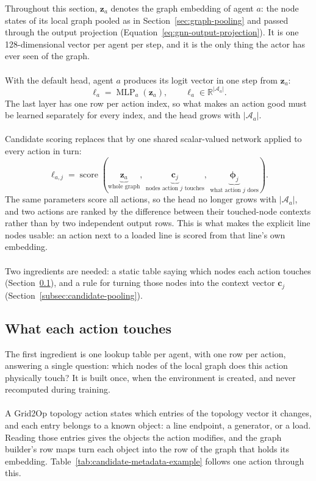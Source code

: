 Throughout this section, $\mathbf{z}_a$ denotes the graph embedding of agent
$a$: the node states of its local graph pooled as in
Section~\ref{sec:graph-pooling} and passed through the output projection
(Equation~\ref{eq:gnn-output-projection}). It is one 128-dimensional vector per
agent per step, and it is the only thing the actor has ever seen of the graph.
\\
\\
With the default head, agent $a$ produces its logit vector in one step from
$\mathbf{z}_a$:
\begin{equation}
  \boldsymbol{\ell}_a = \operatorname{MLP}_a(\mathbf{z}_a),
  \qquad \boldsymbol{\ell}_a\in\mathbb{R}^{|\mathcal{A}_a|}.
  \label{eq:action-index-head}
\end{equation}
The last layer has one row per action index, so what makes an action good must
be learned separately for every index, and the head grows with
$|\mathcal{A}_a|$.
\\
\\
Candidate scoring replaces that by one shared scalar-valued network applied to
every action in turn:
\begin{equation}
  \ell_{a,j} =
  \operatorname{score}
  \left(
    \underbrace{\mathbf{z}_a}_{\text{whole graph}},\
    \underbrace{\mathbf{c}_j}_{\text{nodes action }j\text{ touches}},\
    \underbrace{\boldsymbol{\phi}_j}_{\text{what action }j\text{ does}}
  \right).
  \label{eq:candidate-scoring-head}
\end{equation}
The same parameters score all actions, so the head no longer grows with
$|\mathcal{A}_a|$, and two actions are ranked by the difference between their
touched-node contexts rather than by two independent output rows. This is what
makes the explicit line nodes usable: an action next to a loaded line is scored
from that line's own embedding.
\\
\\
Two ingredients are needed: a static table saying which nodes each action
touches (Section~\ref{subsec:candidate-action-metadata}), and a rule for
turning those nodes into the context vector $\mathbf{c}_j$
(Section~\ref{subsec:candidate-pooling}).

\subsection{What each action touches}
\label{subsec:candidate-action-metadata}

The first ingredient is one lookup table per agent, with one row per action,
answering a single question: which nodes of the local graph does this action
physically touch? It is built once, when the environment is created, and never
recomputed during training.
\\
\\
A Grid2Op topology action states which entries of the topology vector it
changes, and each entry belongs to a known object: a line endpoint, a
generator, or a load. Reading those entries gives the objects the action
modifies, and the graph builder's row maps turn each object into the row of the
graph that holds its embedding. Table~\ref{tab:candidate-metadata-example}
follows one action through this.

